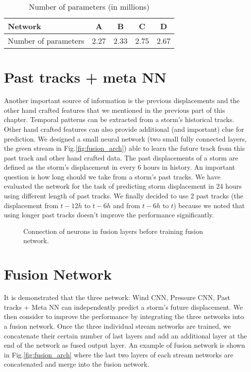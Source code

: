 \begin{table}[]
	\centering
	\caption{Number of parameters (in millions)}
	\begin{tabular}{|l|c|c|c|c|}
		\hline
		Network              & A    & B    & C    & D    \\ \hline
		Number of parameters & 2.27 & 2.33 & 2.75 & 2.67 \\ \hline
	\end{tabular}
	\label{table:neuron_nums}
\end{table}



\section{Past tracks + meta NN}
Another important source of information is the previous displacements and the other hand crafted features that we mentioned in the previous part of this chapter. Temporal patterns can be extracted from a storm's historical tracks. Other hand crafted features can also provide additional (and important) clue for prediction. We designed a small neural network (two small fully connected layers, the green stream in Fig.\ref{fig:fusion_arch}) able to learn the future track from this past track and other hand crafted data. The past displacements of a storm are defined as the storm's displacement in every 6 hours in history. An important question is how long should we take from a storm's past tracks. We have evaluated the network for the task of predicting storm displacement in 24 hours using different length of past tracks. We finally decided to use 2 past tracks (the displacement from $t-12h$ to $t-6h$ and from $t-6h$ to $t$) because we noted that using longer past tracks doesn't improve the performance significantly. 
\begin{figure} 
	\begin{center}
		\hsize {}
	\end{center}
	\caption{Connection of neurons in fusion layers before training fusion network. }
	\label{fig:fusion_details}
\end{figure}
\section{Fusion Network}
It is demonstrated that the three network: Wind CNN,  Pressure CNN,  Past tracks + Meta NN can independently predict a storm's future displacement. We then consider to improve the performance by integrating the three networks into a fusion network. Once the three individual stream networks are trained, we concatenate their certain number of last layers and add an additional layer at the end of the network as fused output layer. An example of fusion network is shown in Fig.\ref{fig:fusion_arch} where the last two layers of each stream networks are concatenated and merge into the fusion network. 

